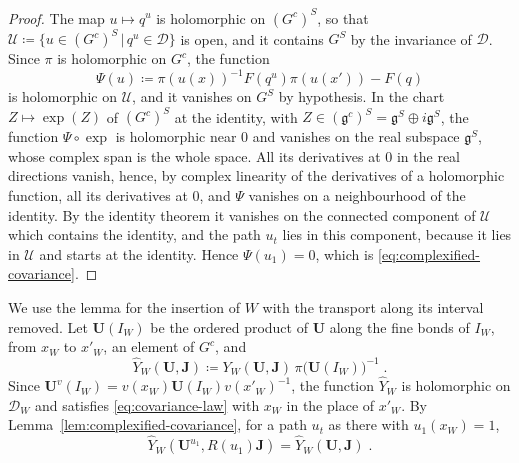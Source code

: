 \begin{proof}
The map $u \mapsto q^u$ is holomorphic on $(G^c)^S$, so that $\mathcal U \coloneqq \{ u \in (G^c)^S \,|\, q^u \in \mathcal D \}$ is open, and it contains $G^S$ by the invariance of $\mathcal D$. Since $\pi$ is holomorphic on $G^c$, the function
\[
    \Psi(u) \coloneqq \pi(u(x))^{-1}F(q^u)\pi(u(x')) - F(q)
\]
is holomorphic on $\mathcal U$, and it vanishes on $G^S$ by hypothesis. In the chart $Z \mapsto \exp(Z)$ of $(G^c)^S$ at the identity, with $Z \in (\mathfrak g^c)^S = \mathfrak g^S \oplus i\mathfrak g^S$, the function $\Psi \circ \exp$ is holomorphic near $0$ and vanishes on the real subspace $\mathfrak g^S$, whose complex span is the whole space. All its derivatives at $0$ in the real directions vanish, hence, by complex linearity of the derivatives of a holomorphic function, all its derivatives at $0$, and $\Psi$ vanishes on a neighbourhood of the identity. By the identity theorem it vanishes on the connected component of $\mathcal U$ which contains the identity, and the path $u_t$ lies in this component, because it lies in $\mathcal U$ and starts at the identity. Hence $\Psi(u_1) = 0$, which is \eqref{eq:complexified-covariance}.
\end{proof}

We use the lemma for the insertion of $W$ with the transport along its interval removed. Let $\mathbf U(I_W)$ be the ordered product of $\mathbf U$ along the fine bonds of $I_W$, from $x_W$ to $x'_W$, an element of $G^c$, and
\begin{equation}\label{eq:base-point-form}
    \hat Y_W(\mathbf U, \mathbf J) \coloneqq Y_W(\mathbf U, \mathbf J)\,\pi\bigl(\mathbf U(I_W)\bigr)^{-1}\;.
\end{equation}
Since $\mathbf U^v(I_W) = v(x_W)\mathbf U(I_W)v(x'_W)^{-1}$, the function $\hat Y_W$ is holomorphic on $\mathcal D_W$ and satisfies \eqref{eq:covariance-law} with $x_W$ in the place of $x'_W$. By Lemma~\ref{lem:complexified-covariance}, for a path $u_t$ as there with $u_1(x_W) = 1$,
\begin{equation}\label{eq:base-point-invariance}
    \hat Y_W(\mathbf U^{u_1}, R(u_1)\mathbf J) = \hat Y_W(\mathbf U, \mathbf J)\;.
\end{equation}

